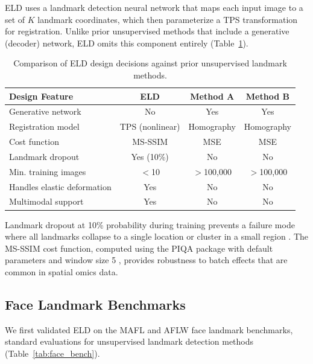\documentclass[11pt]{article}
\begin{document}
ELD uses a landmark detection neural network that maps each input image to a set of $K$ landmark coordinates, which then parameterize a TPS transformation for registration. Unlike prior unsupervised methods \citep{jakab2021unsupervised, theis2016unsupervised} that include a generative (decoder) network, ELD omits this component entirely (Table~\ref{tab:design}).

\begin{table}[H]
\centering
\caption{Comparison of ELD design decisions against prior unsupervised landmark methods.}
\label{tab:design}
\begin{tabular}{lccc}
\toprule
Design Feature & ELD & Method A & Method B \\
\midrule
Generative network & No & Yes & Yes \\
Registration model & TPS (nonlinear) & Homography & Homography \\
Cost function & MS-SSIM & MSE & MSE \\
Landmark dropout & Yes (10\%) & No & No \\
Min. training images & $<$10 & $>$100,000 & $>$100,000 \\
Handles elastic deformation & Yes & No & No \\
Multimodal support & Yes & No & No \\
\bottomrule
\end{tabular}
\end{table}

Landmark dropout at 10\% probability during training prevents a failure mode where all landmarks collapse to a single location or cluster in a small region \citep{dropout_regularization2014}. The MS-SSIM cost function, computed using the PIQA package with default parameters and window size 5 \citep{piqa_package2020}, provides robustness to batch effects that are common in spatial omics data.

\subsection{Face Landmark Benchmarks}

We first validated ELD on the MAFL \citep{mafl_benchmark2015} and AFLW \citep{aflw_benchmark2011} face landmark benchmarks, standard evaluations for unsupervised landmark detection methods (Table~\ref{tab:face_bench}).
\end{document}
